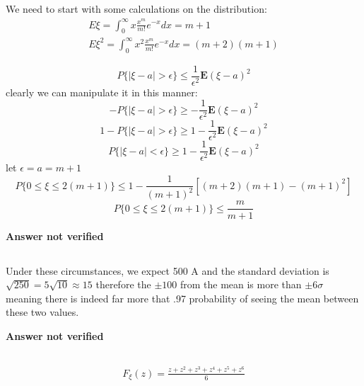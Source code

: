 \subsection{}
We need to start with some calculations on the distribution:
\begin{eqnarray}
	E\xi = \int_0^{\infty} x \frac{x^m}{m!}e^{-x} dx = m+1 \\
	E\xi^2 = \int_0^{\infty} x^2 \frac{x^m}{m!}e^{-x} dx = (m+2)(m+1)
\end{eqnarray}

\begin{equation}
	P \{  | \xi - a | > \epsilon  \} \leq \frac{1}{\epsilon^2}\textbf{E}(\xi - a)^2
\end{equation}
clearly we can manipulate it in this manner:
\begin{equation}
	-P \{  | \xi - a | > \epsilon  \} \geq  - \frac{1}{\epsilon^2}\textbf{E}(\xi - a)^2
\end{equation}
\begin{equation}
	1-P \{  | \xi - a | > \epsilon  \} \geq 1 - \frac{1}{\epsilon^2}\textbf{E}(\xi - a)^2
\end{equation}
\begin{equation}
	P \{  | \xi - a | < \epsilon  \} \geq 1 - \frac{1}{\epsilon^2}\textbf{E}(\xi - a)^2
\end{equation}
let $\epsilon = a = m+1$
\begin{equation}
	P \{ 0 \leq \xi  \leq 2(m+1)  \} \leq 1 - \frac{1}{(m+1)^2}[(m+2)(m+1) - (m+1)^2]
\end{equation}
\begin{equation}
	P \{ 0 \leq \xi  \leq 2(m+1)  \} \leq \frac{m}{m+1}
\end{equation}

\textbf{Answer not verified}

\subsection{}
Under these circumstances, we expect 500 A and the standard deviation is $\sqrt{250}= 5 \sqrt{10} \approx 15$ therefore the $\pm 100$ from the mean is more than $\pm 6 \sigma$ meaning there is indeed far more that .97 probability of seeing the mean between these two values.


\textbf{Answer not verified}


\subsection{}
\begin{eqnarray}
	F_{\xi}(z) = \frac{z +z^2 + z^3 + z^4 + z^5 +z^6}{6}
\end{eqnarray}

